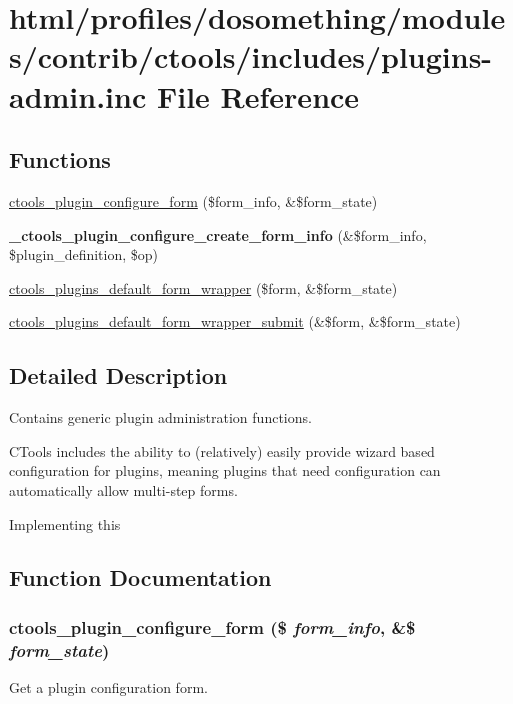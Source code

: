 \hypertarget{plugins-admin_8inc}{
\section{html/profiles/dosomething/modules/contrib/ctools/includes/plugins-\/admin.inc File Reference}
\label{plugins-admin_8inc}
}
\subsection*{Functions}
\begin{DoxyCompactItemize}
\item 
\hyperlink{plugins-admin_8inc_ab41ee2b70ecd7186fc49741236d35ccf}{ctools\_\-plugin\_\-configure\_\-form} (\$form\_\-info, \&\$form\_\-state)
\item 
\hypertarget{plugins-admin_8inc_a58f287ba67aacd3b7807a592f4c457ca}{
{\bfseries \_\-ctools\_\-plugin\_\-configure\_\-create\_\-form\_\-info} (\&\$form\_\-info, \$plugin\_\-definition, \$op)}
\label{plugins-admin_8inc_a58f287ba67aacd3b7807a592f4c457ca}

\item 
\hyperlink{plugins-admin_8inc_a1d39e12bf4223de64c6b09afd842896a}{ctools\_\-plugins\_\-default\_\-form\_\-wrapper} (\$form, \&\$form\_\-state)
\item 
\hyperlink{plugins-admin_8inc_a85e36f694b3c1ac84b67ed129fb4ef59}{ctools\_\-plugins\_\-default\_\-form\_\-wrapper\_\-submit} (\&\$form, \&\$form\_\-state)
\end{DoxyCompactItemize}


\subsection{Detailed Description}
Contains generic plugin administration functions.

CTools includes the ability to (relatively) easily provide wizard based configuration for plugins, meaning plugins that need configuration can automatically allow multi-\/step forms.

Implementing this 

\subsection{Function Documentation}
\hypertarget{plugins-admin_8inc_ab41ee2b70ecd7186fc49741236d35ccf}{
\subsubsection[{ctools\_\-plugin\_\-configure\_\-form}]{\setlength{\rightskip}{0pt plus 5cm}ctools\_\-plugin\_\-configure\_\-form (\$ {\em form\_\-info}, \/  \&\$ {\em form\_\-state})}}
\label{plugins-admin_8inc_ab41ee2b70ecd7186fc49741236d35ccf}
Get a plugin configuration form.

